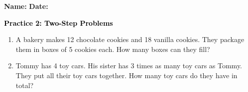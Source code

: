 \documentclass[12pt, letterpaper, fleqn]{article}
\begin{document}
\textbf{Name:} \underline{\hspace{5cm}}
\hfill
\textbf{Date:} \underline{\hspace{3cm}}\\

\begin{tcolorbox}[colback=customteal!20]
    \large\textcolor{black}{\textbf{Practice 2: Two-Step Problems}}
\end{tcolorbox}

\vspace{5mm}
\begin{enumerate}[itemsep=4.5cm, leftmargin=0.6cm]
\item A bakery makes 12 chocolate cookies and 18 vanilla cookies. They package them in boxes of 5 cookies each. How many boxes can they fill?

\item Tommy has 4 toy cars. His sister has 3 times as many toy cars as Tommy. They put all their toy cars together. How many toy cars do they have in total?

\end{enumerate}
\end{document}
